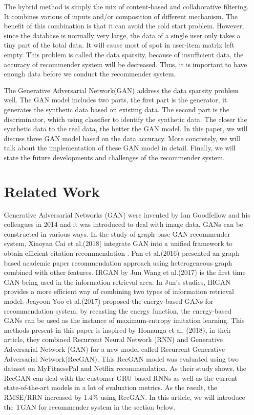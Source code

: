 \documentclass[conference]{IEEEtran}
\begin{document}
The hybrid method is simply the mix of content-based and collaborative filtering. It combines various of inputs and/or composition of different mechanism. The benefit of this combination is that it can avoid the cold start problem. However, since the database is normally very large, the data of a single user only takes a tiny part of the total data. It will cause most of spot in user-item matrix left empty. This problem is called the data sparsity, because of insufficient data, the accuracy of recommender system will be decreased. Thus, it is important to have enough data before we conduct the recommender system. 

The Generative Adversarial Network(GAN) address the data sparsity problem well. The GAN model includes two parts, the first part is the generator, it generates the synthetic data based on existing data. The second part is the discriminator, which using classifier to identify the synthetic data. The closer the synthetic data to the real data, the better the GAN model. In this paper, we will discuss three GAN model based on the data accuracy. More concretely, we will talk about the implementation of these GAN model in detail. Finally, we will state the future developments and challenges of the recommender system. 

\section{Related Work}
Generative Adversarial Networks (GAN) were invented by Ian Goodfellow\cite{goodfellow_gan} and his colleagues in 2014 and it was introduced to deal with image data. GANs can be constructed in various ways. In the study of graph-base GAN recommender system, Xiaoyan Cai et al.(2018) integrate GAN into a unified framework to obtain efficient citation recommendation \cite{cai2018generative}. Pan et al.(2016) presented an graph-based academic paper recommendation approach using heterogeneous graph combined with other features\cite{pan2015academic}. IRGAN by Jun Wang et al.\cite{irgan}(2017) is the first time GAN being used in the information retrieval area. In Jun's studies, IRGAN provides a more efficient way of combining two types of information retrieval model. Jeayoon Yoo et al.(2017)\cite{yoo2017energy} proposed the energy-based GANs for recommendation system, by recasting the energy function, the energy-based GANs can be used as the instance of maximum-entropy imitation learning. 
This methods present in this paper is inspired by Homanga et al. (2018)\cite{RecGAN}, in their article, they combined Recurrent Neural Network (RNN) and Generative Adversarial Network (GAN) for a new model called Recurrent Generative Adversarial Network(RecGAN). This RecGAN model was evaluated using two dataset on MyFitnessPal and Netflix recommendation. As their study shows, the RecGAN can deal with the customer-GRU based RNNs as well as the current state-of-the-art models in a lot of evaluation metrics. As the result, the RMSE/RRN increased by 1.4\% using RecGAN.
In this article, we will introduce the TGAN for recommender system in the section below.
\end{document}
